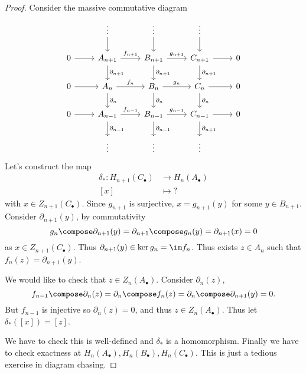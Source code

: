 \documentclass[a4paper]{article}
\renewcommand{\b}{\partial} %
\begin{document}
\begin{proof}
  Consider the massive commutative diagram
  \[
    \begin{tikzcd}
      & \vdots \ar[d] & \vdots \ar[d] & \vdots \ar[d]  \\
      0 \ar[r] & A_{n + 1} \ar[r, "f_{n + 1}"] \ar[d, "\b_{n + 1}"] & B_{n + 1} \ar[r, "g_{n + 1}"] \ar[d, "\b_{n + 1}"] & C_{n + 1} \ar[r] \ar[d, "\b_{n + 1}"] & 0 \\
      0 \ar[r] & A_{n} \ar[r, "f_{n}"] \ar[d, "\b_{n}"] & B_{n} \ar[r, "g_{n}"] \ar[d, "\b_{n}"] & C_{n} \ar[r] \ar[d, "\b_{n}"] & 0 \\
      0 \ar[r] & A_{n - 1} \ar[r, "f_{n - 1}"] \ar[d, "\b_{n - 1}"] & B_{n - 1} \ar[r, "g_{n - 1}"] \ar[d, "\b_{n - 1}"] & C_{n - 1} \ar[r] \ar[d, "\b_{n + 1}"] & 0 \\
      & \vdots & \vdots & \vdots 
    \end{tikzcd}
  \]
  Let's construct the map
  \begin{align*}
    \delta_*: H_{n + 1}(C_\bullet) &\to H_n(A_\bullet) \\
    [x] &\mapsto ?
  \end{align*}
  with \(x \in Z_{n + 1}(C_\bullet)\). Since \(g_{n + 1}\) is surjective, \(x = g_{n + 1}(y)\) for some \(y \in B_{n + 1}\). Consider \(\b_{n + 1}(y)\), by commutativity
  \[
    g_n \compose \b_{n + 1}(y) = \b_{n + 1} \compose g_n (y) = \b_{n + 1}(x) = 0
  \]
  as \(x \in Z_{n + 1}(C_\bullet)\). Thus \(\b_{n + 1}(y) \in \ker g_n = \im f_n\). Thus exists \(z \in A_n\) such that \(f_n(z) = \b_{n + 1}(y)\).

  We would like to check that \(z \in Z_n(A_\bullet)\). Consider \(\b_n(z)\),
  \[
    f_{n - 1} \compose \b_n(z) = \b_n \compose f_n(z) = \b_n \compose \b_{n + 1}(y) = 0.
  \]
  But \(f_{n - 1}\) is injective so \(\b_n(z) = 0\), and thus \(z \in Z_n(A_\bullet)\). Thus let \(\delta_*([x]) = [z]\).

  We have to check this is well-defined and \(\delta_*\) is a homomorphism. Finally we have to check exactness at \(H_n(A_\bullet), H_n(B_\bullet), H_n(C_\bullet)\). This is just a tedious exercise in diagram chasing.
\end{proof}
\end{document}
